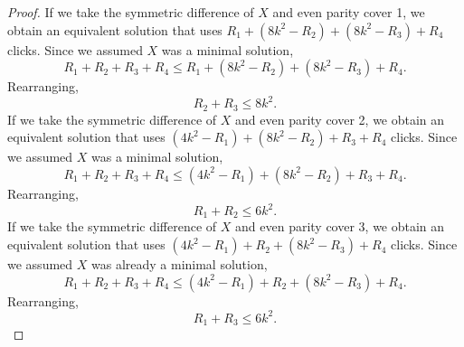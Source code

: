 \documentclass[a4paper]{article}
\begin{document}
\begin{proof}
		If we take the symmetric difference of $X$ and even parity cover 1, we obtain an equivalent solution that uses $R_1 + (8k^2 - R_2) + (8k^2 - R_3) + R_4$ clicks.
		Since we assumed $X$ was a minimal solution,
		\begin{equation*}
			R_1 + R_2 + R_3 + R_4 \leq R_1 + (8k^2 - R_2) + (8k^2 - R_3) + R_4.
		\end{equation*}
		Rearranging,
		\begin{equation*}
			R_2 + R_3 \leq 8k^2.
		\end{equation*}
		If we take the symmetric difference of $X$ and even parity cover 2, we obtain an equivalent solution that uses $(4k^2 - R_1) + (8k^2 - R_2) + R_3 + R_4$ clicks.
		Since we assumed $X$ was a minimal solution,
		\begin{equation*}
			R_1 + R_2 + R_3 + R_4 \leq (4k^2 - R_1) + (8k^2 - R_2) + R_3 + R_4.
		\end{equation*}
		Rearranging,
		\begin{equation*}
			R_1 + R_2 \leq 6k^2.
		\end{equation*}
		If we take the symmetric difference of $X$ and even parity cover 3, we obtain an equivalent solution that uses $(4k^2 - R_1) + R_2 + (8k^2 - R_3) + R_4$ clicks.
		Since we assumed $X$ was already a minimal solution,
		\begin{equation*}
			R_1 + R_2 + R_3 + R_4 \leq (4k^2 - R_1) + R_2 + (8k^2 - R_3) + R_4.
		\end{equation*}
		Rearranging,
		\begin{equation*}
			R_1 + R_3 \leq 6k^2.
		\end{equation*}
	

\end{proof}
\end{document}
